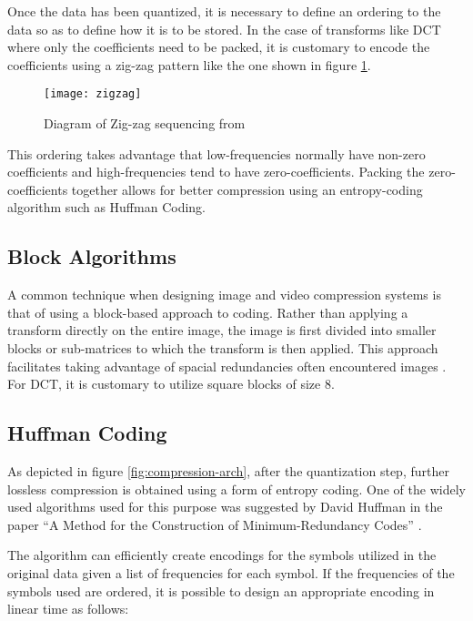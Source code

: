 \documentclass[review,onefignum,onetabnum]{siamart190516}
\begin{document}
Once the data has been quantized, it is necessary to define an ordering to the 
data so as to define how it is to be stored. In the case of transforms like DCT 
where only the coefficients need to be packed, it is customary to encode the coefficients
using a zig-zag pattern like the one shown in figure \ref{fig:zigzag}.

\begin{figure}[tbhp]
  \centering
  \texttt{[image: zigzag]}
  \caption{Diagram of Zig-zag sequencing from \cite{raid2014jpeg}}
  \label{fig:zigzag}
\end{figure}

This ordering takes advantage that low-frequencies normally have non-zero coefficients 
and high-frequencies tend to have zero-coefficients. Packing the zero-coefficients
together allows for better compression using an entropy-coding algorithm such as 
Huffman Coding.

\subsection{Block Algorithms}
A common technique when designing image and video compression systems is that of
using a block-based approach to coding. Rather than applying a transform directly
on the entire image, the image is first divided into smaller blocks or sub-matrices
to which the transform is then applied. This approach facilitates taking advantage of
spacial redundancies often encountered images \cite{ahmed1974discrete}. For DCT, 
it is customary to utilize square blocks of size 8.

\subsection{Huffman Coding}
As depicted in figure \ref{fig:compression-arch}, after the quantization step,
further lossless compression is obtained using a form of entropy coding. One of the
widely used algorithms used for this purpose was suggested by David Huffman in the
paper ``A Method for the Construction of Minimum-Redundancy Codes'' \cite{huffman1952method}.

The algorithm can efficiently create encodings for the symbols utilized in the original
data given a list of frequencies for each symbol. If the frequencies of the symbols
used are ordered, it is possible to design an appropriate encoding in linear time
as follows:
\end{document}
